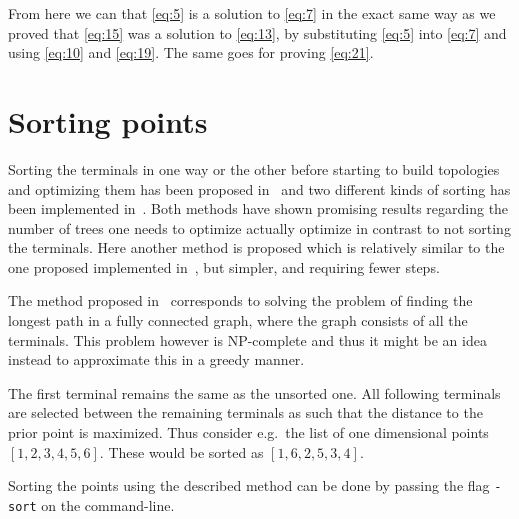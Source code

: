 %
From here we can that \cref{eq:5} is a solution to \cref{eq:7} in the exact same way as
we proved that \cref{eq:15} was a solution to \cref{eq:13}, by substituting
\cref{eq:5} into \cref{eq:7} and using \cref{eq:10} and \cref{eq:19}. The same
goes for proving \cref{eq:21}.

\section{Sorting points}
\label{sec:sorting-points}

Sorting the terminals in one way or the other before starting to build
topologies and optimizing them has been proposed in~\cite{smith1992} and two
different kinds of sorting has been implemented
in~\cite{fonseca2014,vanlaarhoven2013}. Both methods have shown promising
results regarding the number of trees one needs to optimize actually optimize in
contrast to not sorting the terminals. Here another method is
proposed which is relatively similar to the one proposed implemented
in~\cite{fonseca2014}, but simpler, and requiring fewer steps.

The method proposed in~\cite{fonseca2014} corresponds to solving the problem of
finding the longest path in a fully connected graph, where the graph consists of
all the terminals. This problem however is NP-complete\missingref{} and thus
it might be an idea instead to approximate this in a greedy manner.

The first terminal remains the same as the unsorted one. All following terminals
are selected between the remaining terminals as such that the distance to the
prior point is maximized. Thus consider e.g.\ the list of one dimensional points
$[1, 2, 3, 4, 5, 6]$. These would be sorted as $[1, 6, 2, 5, 3, 4]$.

Sorting the points using the described method can be done by passing the flag
\texttt{-sort} on the command-line.

\chapterbreak{}

